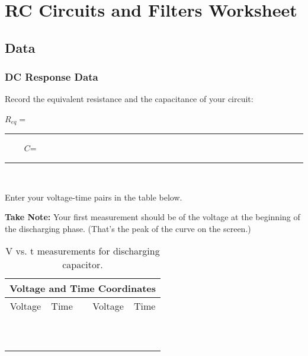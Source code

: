 \vfill
\pagebreak

\renewcommand{\thesection}{\thechapter.W}


\section{RC Circuits and Filters Worksheet}
\subsection{Data}

\subsubsection{DC Response Data}

Record the equivalent resistance and the capacitance of your circuit:

\begin{center}
$R_{eq}=$~ \rule{3cm}{.1mm}~~~~
$C$=~ \rule{3cm}{.1mm} \\
\end{center}

\noindent
Enter your voltage-time pairs in the table below.

\noindent
{\bf Take Note:} Your first measurement should be of the voltage at the beginning of
the discharging phase. (That's the peak of the curve on the screen.) 

\begin{table}[htb]
\begin{center}
\begin{tabular}{|c|c|c|c|c|}
\hline
\multicolumn{5}{|c|}{Voltage and Time Coordinates} \\
\hline
Voltage & Time & & Voltage & Time \\
\hline
\hspace*{3cm} & \hspace*{3cm} & \hspace*{.1cm} & \hspace*{3cm} & \hspace*{3cm} \\
& & & & \\
\hline
& & & & \\
& & & & \\
\hline
& & & & \\
& & & & \\
\hline
& & & & \\
& & & & \\
\hline
& & & & \\
& & & & \\
\hline

\end{tabular}
\end{center}
\caption{V vs. t measurements for discharging capacitor.}
\label{tab:RC:decay}
\end{table}

